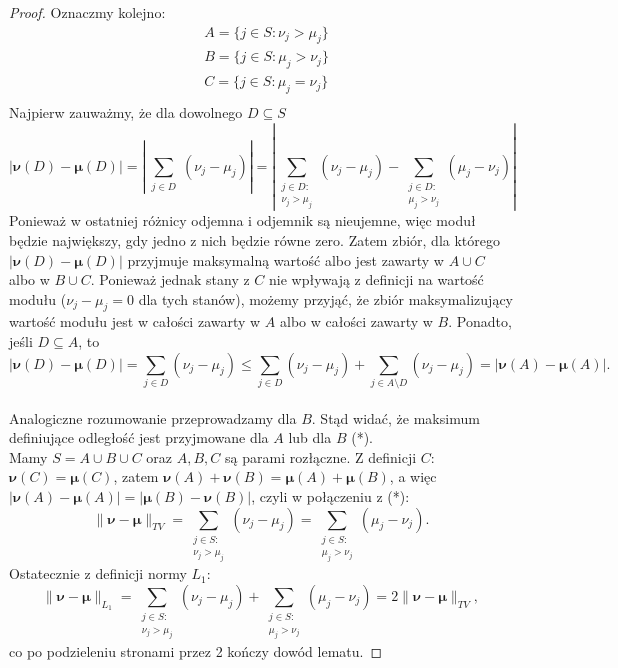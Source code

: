 \documentclass[a4paper]{article}
\theoremstyle{defn}
\theoremstyle{theorem}
\theoremstyle{lemma}
\theoremstyle{cor}
\theoremstyle{fact}
\begin{document}
\begin{proof}
Oznaczmy kolejno: \begin{align*}
&A = \{j \in S: \nu_j > \mu_j\}\\
&B = \{j \in S: \mu_j > \nu_j\}\\
&C = \{j \in S: \mu_j = \nu_j\}\\
\end{align*}
Najpierw zauważmy, że dla dowolnego $D \subseteq S$ $$|\boldsymbol{\nu}(D) - \boldsymbol{\mu}(D)| =  \left\lvert \sum\limits_{\substack{j \in D}} (\nu_j - \mu_j) \right\rvert =  \left\lvert \sum\limits_{\substack{j \in D:\\ \nu_j > \mu_j}} (\nu_j - \mu_j) - \sum\limits_{\substack{j \in D:\\ \mu_j > \nu_j}} (\mu_j - \nu_j) \right\rvert$$
Ponieważ w ostatniej różnicy odjemna i odjemnik są nieujemne, więc moduł będzie największy, gdy jedno z nich będzie równe zero. Zatem zbiór, dla którego $|\boldsymbol{\nu}(D) - \boldsymbol{\mu}(D)|$ przyjmuje maksymalną wartość albo jest zawarty w $A \cup C$ albo w $B \cup C$. Ponieważ jednak stany z $C$ nie wpływają z definicji na wartość modułu ($\nu_j - \mu_j = 0$ dla tych stanów), możemy przyjąć, że zbiór maksymalizujący wartość modułu jest w całości zawarty w $A$ albo w całości zawarty w $B$. Ponadto, jeśli $D \subseteq A$, to 
$$|\boldsymbol{\nu}(D) - \boldsymbol{\mu}(D)| = \sum\limits_{j \in D} (\nu_j - \mu_j) \leq \sum\limits_{j \in D} (\nu_j - \mu_j) + \sum\limits_{j \in A \setminus D} (\nu_j - \mu_j) = |\boldsymbol{\nu}(A) - \boldsymbol{\mu}(A)|.$$\\
Analogiczne rozumowanie przeprowadzamy dla $B$. Stąd widać, że maksimum definiujące odległość jest przyjmowane dla $A$ lub dla $B$ (*). \\
Mamy $S = A \cup B \cup C$ oraz $A, B, C$ są parami rozłączne. Z definicji $C$: $\boldsymbol{\nu}(C) = \boldsymbol{\mu}(C)$, zatem $\boldsymbol{\nu}(A) + \boldsymbol{\nu}(B) = \boldsymbol{\mu}(A) + \boldsymbol{\mu}(B)$, a więc $|\boldsymbol{\nu}(A) - \boldsymbol{\mu}(A)| = |\boldsymbol{\mu}(B) - \boldsymbol{\nu}(B)|$, czyli w połączeniu z (*):
$$\|\boldsymbol{\nu} - \boldsymbol{\mu}\|_{TV} = \sum\limits_{\substack{j \in S:\\ \nu_j > \mu_j}} (\nu_j - \mu_j) = \sum\limits_{\substack{j \in S:\\ \mu_j > \nu_j}} (\mu_j - \nu_j).$$
Ostatecznie z definicji normy $L_1$:
$$\|\boldsymbol{\nu} - \boldsymbol{\mu}\|_{L_1} = \sum\limits_{\substack{j \in S:\\ \nu_j > \mu_j}} (\nu_j - \mu_j) + \sum\limits_{\substack{j \in S:\\ \mu_j > \nu_j}} (\mu_j - \nu_j) = 2\|\boldsymbol{\nu} - \boldsymbol{\mu}\|_{TV},$$
co po podzieleniu stronami przez 2 kończy dowód lematu.
\end{proof}
\end{document}
